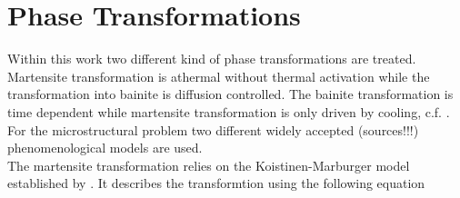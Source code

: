 \section{Phase Transformations}

Within this work two different kind of phase transformations are treated. Martensite transformation is athermal without thermal activation while the transformation into bainite is diffusion controlled. The bainite transformation is time dependent while martensite transformation is only driven by cooling, c.f. \cite{totten_steel_2007}. \\

For the microstructural problem two different widely accepted (sources!!!) phenomenological models are used.\\
The martensite transformation relies on the Koistinen-Marburger model established by \cite{koistinen_general_1959}. It describes the transformtion using the following equation \\\\

